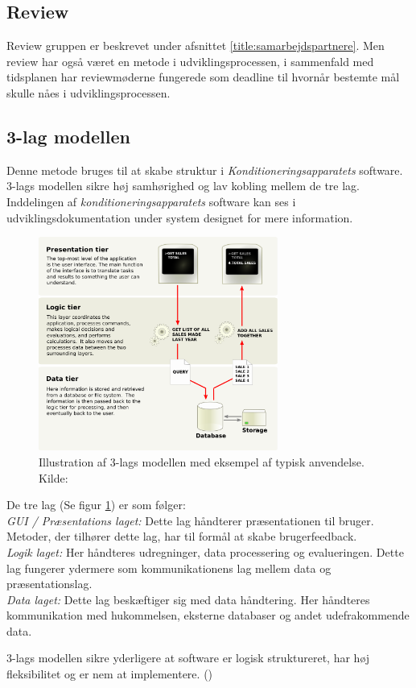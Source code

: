 \subsection{Review}
Review gruppen er beskrevet under afsnittet \ref{title:samarbejdspartnere}. Men review har også været en metode i udviklingsprocessen, i sammenfald med tidsplanen har reviewmøderne fungerede som deadline til hvornår bestemte mål skulle nåes i udviklingsprocessen. 

\subsection{3-lag modellen}
Denne metode bruges til at skabe struktur i \textit{Konditioneringsapparatets} software. 3-lags modellen sikre høj samhørighed og lav kobling mellem de tre lag. Inddelingen af \textit{konditioneringsapparatets} software kan ses i udviklingsdokumentation under system designet for mere information. 
\begin{figure}[H]
	\centering
\includegraphics[width = 0.7\textwidth]{billeder/trelagsmodel.png}
\caption{Illustration af 3-lags modellen med eksempel af typisk anvendelse. Kilde: \cite{Billede:2}}\label{fig:3lagsmodel}
\end{figure}

De tre lag (Se figur \ref{fig:3lagsmodel}) er som følger: \\
\textit{GUI / Præsentations laget:} Dette lag håndterer præsentationen til bruger. Metoder, der tilhører dette lag, har til formål at skabe brugerfeedback. \\
\textit{Logik laget:} Her håndteres udregninger, data processering og evalueringen. Dette lag fungerer ydermere som kommunikationens lag mellem data og præsentationslag. 
\\ \textit{Data laget:} Dette lag beskæftiger sig med data håndtering. Her håndteres kommunikation med hukommelsen, eksterne databaser og andet udefrakommende data.

3-lags modellen sikre yderligere at software er logisk struktureret, har høj fleksibilitet og er nem at implementere. (\cite{RefWorks:31})
